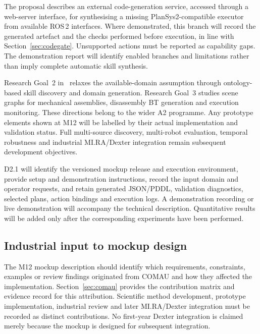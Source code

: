 \documentclass{plan4ari_report}
\begin{document}
 The proposal describes an external code-generation service, accessed through a web-server interface, for synthesising a missing PlanSys2-compatible executor from available ROS\,2 interfaces. Where demonstrated, this branch will record the generated artefact and the checks performed before execution, in line with Section~\ref{sec:codegate}. Unsupported actions must be reported as capability gaps. The demonstration report will identify enabled branches and limitations rather than imply complete automatic skill synthesis.

 Research Goal~2 in~\cite{sandrini2026proposal} relaxes the available-domain assumption through ontology-based skill discovery and domain generation. Research Goal~3 studies scene graphs for mechanical assemblies, disassembly BT generation and execution monitoring. These directions belong to the wider A2 programme. Any prototype elements shown at M12 will be labelled by their actual implementation and validation status. Full multi-source discovery, multi-robot evaluation, temporal robustness and industrial MI.RA/Dexter integration remain subsequent development objectives.

 D2.1 will identify the versioned mockup release and execution environment, provide setup and demonstration instructions, record the input domain and operator requests, and retain generated JSON/PDDL, validation diagnostics, selected plans, action bindings and execution logs. A demonstration recording or live demonstration will accompany the technical description. Quantitative results will be added only after the corresponding experiments have been performed.

\subsection{Industrial input to mockup design}
The M12 mockup description should identify which requirements, constraints, examples or review findings originated from COMAU and how they affected the implementation. Section~\ref{sec:comau} provides the contribution matrix and evidence record for this attribution. Scientific method development, prototype implementation, industrial review and later MI.RA/Dexter integration must be recorded as distinct contributions. No first-year Dexter integration is claimed merely because the mockup is designed for subsequent integration.

\end{document}
